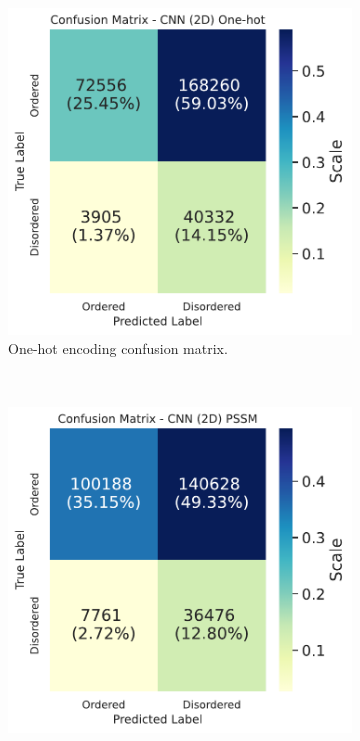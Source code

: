 \documentclass{l4proj}
\begin{document}
\begin{figure}[!htb] 
    \centering
    \begin{subfigure}[b]{0.48\textwidth}
        \includegraphics[width=\textwidth]{images/confmats/CNN2D1hot-cf.pdf}
        \caption{One-hot encoding confusion matrix.}
        \label{fig:cf2d1hot}
    \end{subfigure}
    ~
    \begin{subfigure}[b]{0.48\textwidth}
        \includegraphics[width=\textwidth]{images/confmats/CNN2Dpssm-cf.pdf}

\end{subfigure}
\end{figure}
\end{document}
